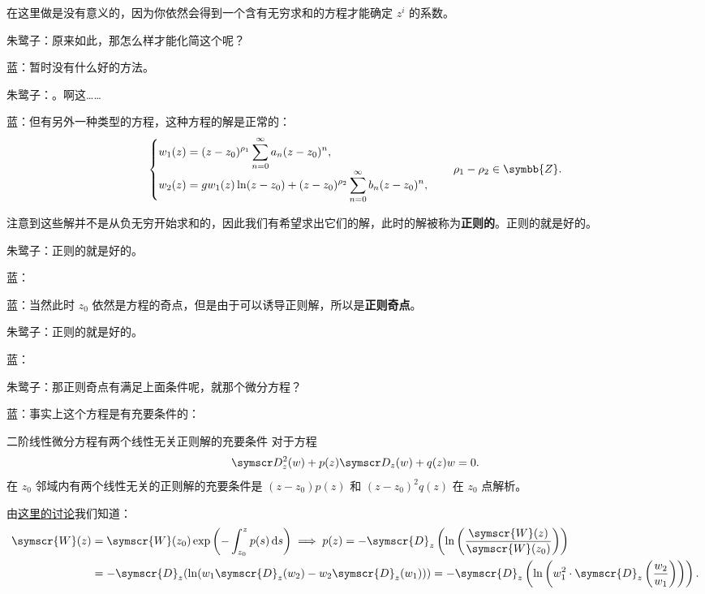在这里做是没有意义的，因为你依然会得到一个含有无穷求和的方程才能确定 \(z^i\) 的系数。

朱鹭子：原来如此，那怎么样才能化简这个呢？

蓝：暂时没有什么好的方法。

朱鹭子：。啊这……

蓝：但有另外一种类型的方程，这种方程的解是正常的：
\vspace{1em}
\[
	\begin{cases}
		\displaystyle w_1(z)=(z-z_0)^{\rho _1}\sum_{n=0}^{\infty} a_n (z-z_0)^n, \\
		\displaystyle w_2(z)=gw_1(z)\ln (z-z_0)+(z-z_0)^{\rho _2}\sum_{n=0}^{\infty} b_n (z-z_0)^n,
	\end{cases}\quad  \rho _1-\rho _2\in\symbb{Z}.
\]
\vspace{0em}

注意到这些解并不是从负无穷开始求和的，因此我们有希望求出它们的解，此时的解被称为\textbf{正则的}。正则的就是好的。

朱鹭子：正则的就是好的。

蓝：

蓝：当然此时 \(z_0\) 依然是方程的奇点，但是由于可以诱导正则解，所以是\textbf{正则奇点}。

朱鹭子：正则的就是好的。

蓝：

朱鹭子：那正则奇点有满足上面条件呢，就那个微分方程？

蓝：事实上这个方程是有充要条件的：
\begin{tho}{二阶线性微分方程有两个线性无关正则解的充要条件}{}
	对于方程
	\[
		\ddw+p(z)\dw+q(z)w=0
		.\]
	在 \(z_0\) 邻域内有两个线性无关的正则解的充要条件是 \((z-z_0)p(z)\) 和 \((z-z_0)^2 q(z)\) 在 \(z_0\) 点解析。
\end{tho}


由\hyperref[wronskyhlsyupz]{\underline{这里的讨论}}我们知道：
\[
	\begin{aligned}
		\symscr{W} (z) & =\symscr{W} (z_0)\exp \left( -\int_{z_0}^z p(s) \,\mathrm{d}s  \right) \implies p(z) =-\symscr{D} _z\left( \ln \left( \frac{\symscr{W} (z)}{\symscr{W} (z_0)} \right)  \right)    \\
		               & =-\symscr{D} _z (\ln (w_1\symscr{D} _z(w_2)-w_2\symscr{D} _z(w_1))) = -\symscr{D} _z\left( \ln \left( w_1^2\cdot \symscr{D} _z\left(  \frac{w_2}{w_1} \right)  \right)  \right) .\end{aligned}
\]

